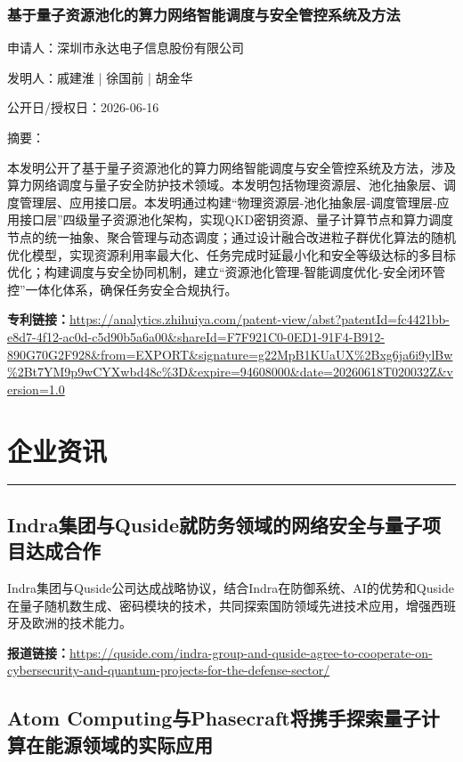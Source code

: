 \documentclass[12pt,a4paper]{ctexart}
\begin{document}
\subsubsection{ 基于量子资源池化的算力网络智能调度与安全管控系统及方法 }

申请人：深圳市永达电子信息股份有限公司

发明人：戚建淮 | 徐国前 | 胡金华

公开日/授权日：2026-06-16

摘要：

本发明公开了基于量子资源池化的算力网络智能调度与安全管控系统及方法，涉及算力网络调度与量子安全防护技术领域。本发明包括物理资源层、池化抽象层、调度管理层、应用接口层。本发明通过构建“物理资源层‑池化抽象层‑调度管理层‑应用接口层”四级量子资源池化架构，实现QKD密钥资源、量子计算节点和算力调度节点的统一抽象、聚合管理与动态调度；通过设计融合改进粒子群优化算法的随机优化模型，实现资源利用率最大化、任务完成时延最小化和安全等级达标的多目标优化；构建调度与安全协同机制，建立“资源池化管理‑智能调度优化‑安全闭环管控”一体化体系，确保任务安全合规执行。

\noindent\textbf{专利链接：}\url{https://analytics.zhihuiya.com/patent-view/abst?patentId=fc4421bb-e8d7-4f12-ac0d-c5d90b5a6a00&shareId=F7F921C0-0ED1-91F4-B912-890G70G2F928&from=EXPORT&signature=g22MpB1KUaUX%2Bxg6ja6i9ylBw%2Bt7YM9p9wCYXwbd48c%3D&expire=94608000&date=20260618T020032Z&version=1.0}




\newpage
\section{企业资讯}
\vspace{-0.5em}
\noindent\rule{\linewidth}{1.5pt}

\subsection{ Indra集团与Quside就防务领域的网络安全与量子项目达成合作 }

Indra集团与Quside公司达成战略协议，结合Indra在防御系统、AI的优势和Quside在量子随机数生成、密码模块的技术，共同探索国防领域先进技术应用，增强西班牙及欧洲的技术能力。

\noindent\textbf{报道链接：}\url{https://quside.com/indra-group-and-quside-agree-to-cooperate-on-cybersecurity-and-quantum-projects-for-the-defense-sector/}

\subsection{ Atom Computing与Phasecraft将携手探索量子计算在能源领域的实际应用 }
\end{document}
